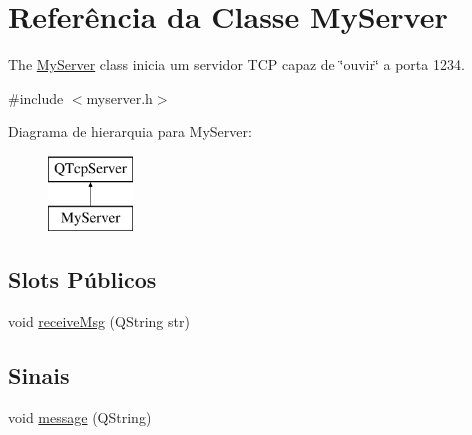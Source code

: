 \hypertarget{class_my_server}{}\section{Referência da Classe My\+Server}
\label{class_my_server}


The \mbox{\hyperlink{class_my_server}{My\+Server}} class inicia um servidor T\+CP capaz de \char`\"{}ouvir\char`\"{} a porta 1234.  




{\ttfamily \#include $<$myserver.\+h$>$}

Diagrama de hierarquia para My\+Server\+:\begin{figure}[H]
\begin{center}
\leavevmode
\includegraphics[height=2.000000cm]{class_my_server}
\end{center}
\end{figure}
\subsection*{Slots Públicos}
\begin{DoxyCompactItemize}
\item 
void \mbox{\hyperlink{class_my_server_ac795ee6f1607c0fa4e635a0da2bf2164}{receive\+Msg}} (Q\+String str)
\end{DoxyCompactItemize}
\subsection*{Sinais}
\begin{DoxyCompactItemize}
\item 
void \mbox{\hyperlink{class_my_server_a2b884bce37840b1b461363a37b463b30}{message}} (Q\+String)
\end{DoxyCompactItemize}
